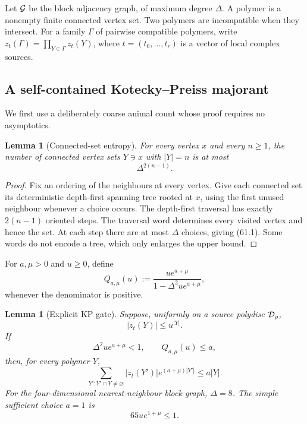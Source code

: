 \documentclass[11pt,oneside]{book}
\newtheorem{lemma}[theorem]{Lemma}
\theoremstyle{definition}
\theoremstyle{remark}
\begin{document}
Let \({\cal G}\) be the block adjacency graph, of maximum degree
\(\Delta\).  A polymer is a nonempty finite connected vertex set.
Two polymers are incompatible when they intersect.  For a family
\(\Gamma\) of pairwise compatible polymers, write
\(z_t(\Gamma)=\prod_{Y\in\Gamma}z_t(Y)\), where
\(t=(t_0,\ldots,t_r)\) is a vector of local complex sources.

\subsection{A self-contained Kotecky--Preiss majorant}

We first use a deliberately coarse animal count whose proof requires
no asymptotics.

\begin{lemma}[Connected-set entropy]
\label{lem:e8v61-animal-count}
For every vertex \(x\) and every \(n\ge1\), the number of connected
vertex sets \(Y\ni x\) with \(|Y|=n\) is at most
\[
                         \Delta^{2(n-1)}.                    \tag{61.1}
\]
\end{lemma}

\begin{proof}
Fix an ordering of the neighbours at every vertex.  Give each
connected set its deterministic depth-first spanning tree rooted at
\(x\), using the first unused neighbour whenever a choice occurs.
The depth-first traversal has exactly \(2(n-1)\) oriented steps.
The traversal word determines every visited vertex and hence the
set.  At each step there are at most \(\Delta\) choices, giving
(61.1).  Some words do not encode a tree, which only enlarges the
upper bound.
\end{proof}

For \(a,\mu>0\) and \(u\ge0\), define
\[
 Q_{a,\mu}(u)
 :=\frac{u e^{a+\mu}}
 {1-\Delta^2u e^{a+\mu}},                                   \tag{61.2}
\]
whenever the denominator is positive.

\begin{lemma}[Explicit KP gate]
\label{lem:e8v61-KP-gate}
Suppose, uniformly on a source polydisc \({\cal D}_\rho\),
\[
                         |z_t(Y)|\le u^{|Y|}.                 \tag{61.3}
\]
If
\[
 \Delta^2u e^{a+\mu}<1,\qquad Q_{a,\mu}(u)\le a,            \tag{61.4}
\]
then, for every polymer \(Y\),
\[
 \sum_{Y':Y'\cap Y\ne\varnothing}
 |z_t(Y')|e^{(a+\mu)|Y'|}
 \le a|Y|.                                                   \tag{61.5}
\]
For the four-dimensional nearest-neighbour block graph,
\(\Delta=8\).  The simple sufficient choice \(a=1\) is
\[
                  \boxed{65u e^{1+\mu}\le1.}                \tag{61.6}
\]
\end{lemma}
\end{document}
